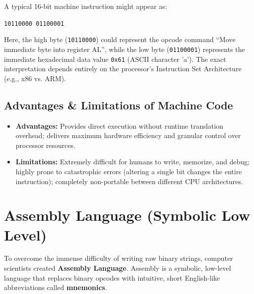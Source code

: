 \begin{example}
A typical 16-bit machine instruction might appear as:
\begin{center}
\texttt{10110000 01100001}
\end{center}
Here, the high byte (\texttt{10110000}) could represent the opcode command ``Move immediate byte into register AL'', while the low byte (\texttt{01100001}) represents the immediate hexadecimal data value \texttt{0x61} (ASCII character 'a'). The exact interpretation depends entirely on the processor's Instruction Set Architecture (e.g., x86 vs. ARM).
\end{example}

\subsection{Advantages \& Limitations of Machine Code}
\begin{itemize}[leftmargin=1.2em]
    \item \textbf{Advantages:} Provides direct execution without runtime translation overhead; delivers maximum hardware efficiency and granular control over processor resources.
    \item \textbf{Limitations:} Extremely difficult for humans to write, memorize, and debug; highly prone to catastrophic errors (altering a single bit changes the entire instruction); completely non-portable between different CPU architectures.
\end{itemize}

\section{Assembly Language (Symbolic Low Level)}

To overcome the immense difficulty of writing raw binary strings, computer scientists created \textbf{Assembly Language}. Assembly is a symbolic, low-level language that replaces binary opcodes with intuitive, short English-like abbreviations called \textbf{mnemonics}.

